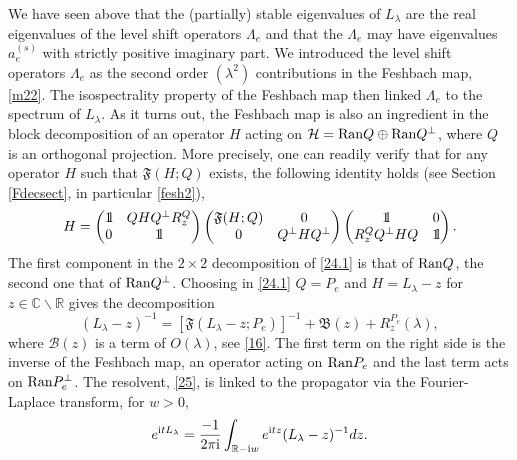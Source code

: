 \documentclass[letterpaper,onecolumn,11pt,accepted=2021-12-09]{quantumarticle}
\numberwithin{equation}{section}
\renewcommand{\i}{{\rm i}}
\newcommand{\bbbone}{\mathchoice {\rm 1\mskip-4mu l} {\rm 1\mskip-4mu l}
	{\rm 1\mskip-4.5mu l} {\rm 1\mskip-5mu l}}
\begin{document}
We have seen above that the (partially) stable eigenvalues of $L_\lambda$ are the real eigenvalues of the level shift operators $\Lambda_e$ and that the $\Lambda_e$ may have eigenvalues $a_e^{(s)}$ with strictly positive imaginary part. We introduced the level shift operators $\Lambda_e$ as the second order $(\lambda^2)$ contributions in the Feshbach map,  \eqref{m22}. The isospectrality property of the Feshbach map then linked $\Lambda_e$ to the spectrum of $L_\lambda$. As it turns out, the Feshbach map is also an ingredient in  the block decomposition of an operator $H$ acting on ${\mathcal H}={\rm Ran}Q\oplus {\rm Ran}Q^\perp$, where $Q$ is an orthogonal projection. More precisely, one can readily verify that for any operator $H$ such that ${\mathfrak F}(H;Q)$ exists, the following identity holds (see Section \ref{Fdecsect}, in particular \eqref{fesh2}), 
\begin{equation}
H= 
\begin{pmatrix}
		\bbbone & QH Q^\perp R_z^Q\\
		0 & \bbbone
\end{pmatrix}
\begin{pmatrix}
		{\mathfrak F}(H;Q) & 0\\
		0 & Q^\perp H Q^\perp
\end{pmatrix}
\begin{pmatrix}
		\bbbone & 0 \\
		R^Q_zQ^\perp HQ & \bbbone
\end{pmatrix}.
\label{24.1}
\end{equation}
The first component in the $2\times 2$ decomposition of \eqref{24.1} is that of ${\rm Ran}Q$, the second one that of ${\rm Ran}Q^\perp$. Choosing in \eqref{24.1} $Q=P_e$ and $H=L_\lambda-z$ for $z\in{\mathbb C}\backslash{\mathbb R}$ gives the decomposition
\begin{equation}
(L_\lambda-z)^{-1}  = [{\mathfrak F}(L_\lambda-z;P_e)]^{-1} + {\mathfrak B}(z) + R_z^{P_e}(\lambda),
\label{25}
\end{equation}
where ${\mathcal B}(z)$ is a term of $O(\lambda)$, see \eqref{16}. The first term on the right side is the inverse of the Feshbach map, an operator acting on ${\rm Ran}P_e$ and the last term acts on ${\rm Ran}P_e^\perp$. The resolvent, \eqref{25}, is linked to the propagator via the Fourier-Laplace transform, for $w>0$,
\begin{equation}
e^{\i t L_\lambda} = \frac{-1}{2\pi\i}\int_{{\mathbb R}-\i w} e^{\i t z} (L_\lambda-z)^{-1} dz.
\label{26}
\end{equation}
\end{document}
